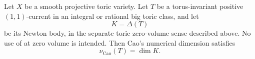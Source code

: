 \begin{theorem}\label{thm:ok-toric-zero-mass}
Let \(X\) be a smooth projective toric variety.
Let \(T\) be a torus-invariant positive \((1,1)\)-current in an integral or
rational big toric class, and let
\[
                             K=\Delta(T)
\]
be its Newton body, in the separate toric zero-volume sense described
above.  No use of  at zero volume is
intended.
Then Cao's numerical dimension satisfies
\[
                         \nu_{\mathrm{Cao}}(T)=\dim K.
\tag{55.50}\label{eq:ok-toric-numdim}
\]
\end{theorem}
